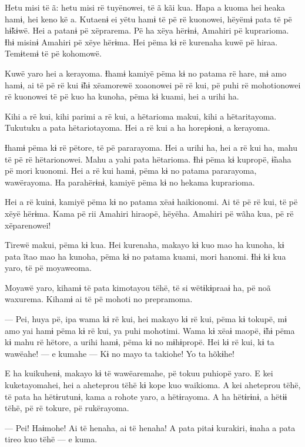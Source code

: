  

Hetu misi të ã: hetu misi rë tuyënowei, të ã kãi kua. Hapa a kuoma hei
heaka hamɨ, hei keno kë a. Kutaenɨ ei yëtu hamɨ të pë rë kuonowei,
hëyëmɨ pata të pë hɨ̃kɨwë. Hei a patanɨ pë xëprarema. Pë ha xëya hërɨnɨ,
Amahiri pë kuprarioma. Ɨhɨ misinɨ Amahiri pë xëye hërɨma. Hei pëma kɨ rë
kurenaha kuwë pë hiraa. Temɨtemɨ të pë kohomowë.

Kuwë yaro hei a kerayoma. Ɨhamɨ kamiyë pëma kɨ no patama rë hare, mɨ amo
hamɨ, ai të pë rë kui ɨ̃hɨ xëamorewë xoaonowei pë rë kui, pë puhi rë
mohotionowei rë kuonowei të pë kuo ha kunoha, pëma kɨ kuami, hei a urihi
ha.

Kihi a rë kui, kihi parimi a rë kui, a hëtarioma makui, kihi a
hëtaritayoma. Tukutuku a pata hëtariotayoma. Hei a rë kui a ha
horepɨonɨ, a kerayoma.

Ɨhamɨ pëma kɨ rë pëtore, të pë pararayoma. Hei a urihi ha, hei a rë kui
ha, mahu të pë rë hëtarionowei. Mahu a yahi pata hëtarioma. Ɨhɨ pëma kɨ
kupropë, ɨ̃naha pë mori kuonomi. Hei a rë kui hamɨ, pëma kɨ no patama
pararayoma, wawërayoma. Ha parahërɨnɨ, kamiyë pëma kɨ no hekama
kuprarioma.

Hei a rë kuinɨ, kamiyë pëma kɨ no patama xëaɨ haikionomi. Ai të pë rë
kui, të pë xëyë hërɨma. Kama pë rii Amahiri hiraopë, hëyëha. Amahiri pë
wãha kua, pë rë xëparenowei!

Tirewë makui, pëma kɨ kua. Hei kurenaha, makayo kɨ kuo mao ha kunoha, kɨ
pata ĩtao mao ha kunoha, pëma kɨ no patama kuami, mori hanomi. Ɨhɨ kɨ
kua yaro, të pë moyaweoma.

Moyawë yaro, kihamɨ të pata kimotayou tëhë, të si wëtɨkɨpraaɨ ha, pë noã
waxurema. Kihamɨ ai të pë mohoti no prepramoma.

--- Pei, huya pë, ipa wama kɨ rë kui, hei makayo kɨ rë kui, pëma kɨ
tokupë, mɨ amo yai hamɨ pëma kɨ rë kui, ya puhi mohotimi. Wama kɨ xëaɨ
maopë, ɨ̃hɨ pëma kɨ mahu rë hëtore, a urihi hamɨ, pëma kɨ no mɨhɨpropë.
Hei kɨ rë kui, kɨ ta wawëahe! --- e kumahe --- Kɨ no mayo ta takiohe! Yo
ta hõkɨhe!

E ha kuikuhenɨ, makayo kɨ të wawëaremahe, pë tokuu puhiopë yaro. E kei
kuketayomahei, hei a aheteprou tëhë kɨ kope kuo waikioma. A kei
aheteprou tëhë, të pata ha hëtɨrutunɨ, kama a rohote yaro, a hëtɨrayoma.
A ha hëtɨrɨnɨ, a hëtɨɨ tëhë, pë rë tokure, pë rukërayoma.

--- Pei! Haɨmohe! Ai të henaha, ai të henaha! A pata pitaɨ kurakiri,
ɨnaha a pata tireo kuo tëhë --- e kuma.

